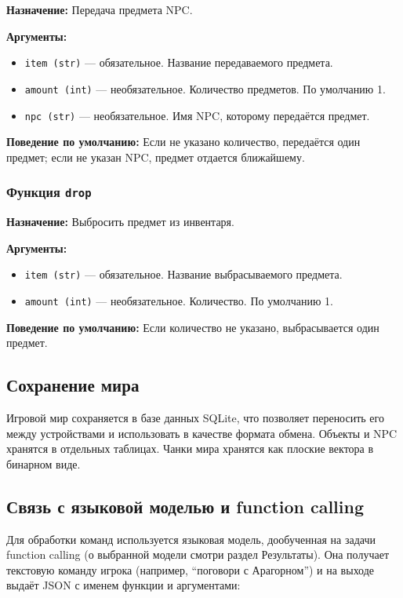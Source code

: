 \documentclass[14pt]{extarticle}
\begin{document}
\textbf{Назначение:} Передача предмета NPC.

\textbf{Аргументы:}
\begin{itemize}
    \item \texttt{item (str)} --- обязательное. Название передаваемого предмета.
    \item \texttt{amount (int)} --- необязательное. Количество предметов. По умолчанию 1.
    \item \texttt{npc (str)} --- необязательное. Имя NPC, которому передаётся предмет.
\end{itemize}

\textbf{Поведение по умолчанию:} Если не указано количество, передаётся один предмет; если не указан NPC, предмет отдается ближайшему.

\subsubsection{Функция \texttt{drop}}

\textbf{Назначение:} Выбросить предмет из инвентаря.

\textbf{Аргументы:}
\begin{itemize}
    \item \texttt{item (str)} --- обязательное. Название выбрасываемого предмета.
    \item \texttt{amount (int)} --- необязательное. Количество. По умолчанию 1.
\end{itemize}

\textbf{Поведение по умолчанию:} Если количество не указано, выбрасывается один предмет.

\subsection{Сохранение мира}

Игровой мир сохраняется в базе данных SQLite, что позволяет переносить его между устройствами и использовать в качестве формата обмена. Объекты и NPC хранятся в отдельных таблицах. Чанки мира хранятся как плоские вектора в бинарном виде.

\subsection{Связь с языковой моделью и function calling}

Для обработки команд используется языковая модель, дообученная на задачи function calling (о выбранной модели смотри раздел Результаты). Она получает текстовую команду игрока (например, \enquote{поговори с Арагорном}) и на выходе выдаёт JSON с именем функции и аргументами:
\end{document}
